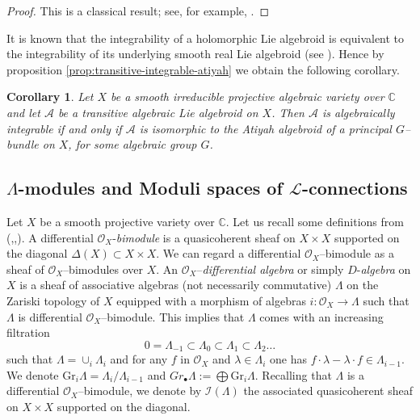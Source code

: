 \documentclass[12pt,reqno]{amsart}
\numberwithin{equation}{subsection}
\newtheorem{corollary}[equation]{Corollary}
\theoremstyle{definition}
\theoremstyle{theorem}
\begin{document}
\begin{proof}
	This is a classical result; see, for example, \cite[Corollary 6.4]{Moerdijk-2003}.
\end{proof}

It is known that the integrability of a holomorphic Lie algebroid is
equivalent to the integrability of its underlying smooth real Lie
algebroid (see \cite[Theorem 3.17]{GSX-2009}). Hence by proposition \eqref{prop:transitive-integrable-atiyah} we obtain the
following corollary.
\begin{corollary}\label{cor:classifcation of integrable transitive-Lie algebroid}
	Let $X$ be a smooth irreducible projective algebraic variety over $\mathbb{C}$ and let $\mathcal{A}$ be a transitive algebraic Lie algebroid on $X$. Then $\mathcal{A}$ is algebraically integrable if and only if
	$\mathcal{A}$ is isomorphic to the Atiyah algebroid of a principal
	$G$--bundle on $X$, for some algebraic group $G$.
\end{corollary}










\subsection{$\Lambda$-modules and Moduli spaces of $\mathcal{L}$-connections}
Let $X$ be a smooth projective variety over $\mathbb{C}$. Let us recall some definitions from (\cite[\S\,1]{Beilinson-Bernstein-1993},\cite[\S\,2.1]{FT-2017},\cite[\S\,2]{CT.Simpson-1994}). A differential $\mathcal{O}_{X}$-\textit{bimodule} is a quasicoherent sheaf on $X \times X$ supported on the diagonal $\Delta(X)\subset X \times X$. We can regard a differential $\mathcal{O}_{X}$--bimodule as a sheaf of $\mathcal{O}_{X}$--bimodules over $X$. An $\mathcal{O}_{X}$--\textit{differential algebra} or simply $D$-\textit{algebra} on $X$ is a sheaf of associative algebras (not necessarily commutative) $\Lambda$ on the Zariski topology of $X$ equipped with a morphism
of algebras $i : \mathcal{O}_{X} \rightarrow \Lambda$ such that $\Lambda$ is differential $\mathcal{O}_{X}$--bimodule. This implies that $\Lambda$ comes with an increasing filtration
\[0=\Lambda_{-1}\subset \Lambda_{0}\subset\Lambda_{1}\subset \Lambda_{2}\dots\]
such that $\Lambda =\cup_{i}\Lambda_{i}$ and for any $f$ in $\mathcal{O}_{X}$ and $\lambda \in \Lambda_{i}$ one has $f\cdot \lambda-\lambda\cdot f \in \Lambda_{i-1}$. We denote
$\text{Gr}_{i}\Lambda=\Lambda_{i}/\Lambda_{i-1}$ and $Gr_{\bullet}\Lambda:= \bigoplus\text{Gr}_{i}\Lambda$. Recalling that $\Lambda$ is a differential $\mathcal{O}_{X}$--bimodule,
we denote by $\mathscr{I}(\Lambda)$ the associated quasicoherent sheaf on $X \times X$ supported on the diagonal.
\end{document}
